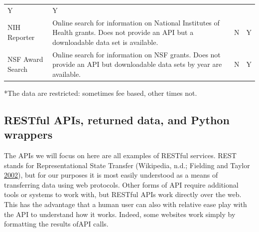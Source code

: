 \documentclass[]{krantz}
\begin{document}
\begin{longtable}[]{@{}llcc@{}}
\begin{minipage}[t]{0.02\columnwidth}
Y\strut
\end{minipage} & \begin{minipage}[t]{0.02\columnwidth}\centering\strut
Y\strut
\end{minipage}\tabularnewline
\begin{minipage}[t]{0.10\columnwidth}\raggedright\strut
NIH Reporter\strut
\end{minipage} & \begin{minipage}[t]{0.74\columnwidth}\raggedright\strut
Online search for information on National Institutes of Health grants.
Does not provide an API but a downloadable data set is available.\strut
\end{minipage} & \begin{minipage}[t]{0.02\columnwidth}\centering\strut
N\strut
\end{minipage} & \begin{minipage}[t]{0.02\columnwidth}\centering\strut
Y\strut
\end{minipage}\tabularnewline
\begin{minipage}[t]{0.10\columnwidth}\raggedright\strut
NSF Award Search\strut
\end{minipage} & \begin{minipage}[t]{0.74\columnwidth}\raggedright\strut
Online search for information on NSF grants. Does not provide an API but
downloadable data sets by year are available.\strut
\end{minipage} & \begin{minipage}[t]{0.02\columnwidth}\centering\strut
N\strut
\end{minipage} & \begin{minipage}[t]{0.02\columnwidth}\centering\strut
Y\strut
\end{minipage}\tabularnewline
\bottomrule
\end{longtable}

*The data are restricted: sometimes fee based, other times not.

\subsection{RESTful APIs, returned data, and Python
wrappers}\label{sec:4-3.2}

The APIs we will focus on here are all examples of RESTful services.
REST stands for Representational State Transfer (Wikipedia, n.d.;
Fielding and Taylor
\protect\hyperlink{ref-fielding2002principled}{2002}), but for our
purposes it is most easily understood as a means of transferring data
using web protocols. Other forms of API require additional tools or
systems to work with, but RESTful APIs work directly over the web. This
has the advantage that a human user can also with relative ease play
with the API to understand how it works. Indeed, some websites work
simply by formatting the results ofAPI calls.
\end{document}
